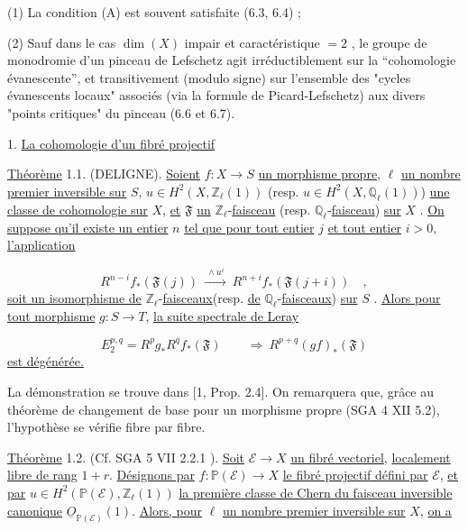 (1) La condition (A) est souvent satisfaite (6.3, 6.4) ;

(2) Sauf dans le cas $\dim(X)$ impair et caractéristique $= 2$ , le groupe de monodromie d'un pinceau de Lefschetz agit irréductiblement sur la ``cohomologie évanescente'', et transitivement (modulo signe) sur l'ensemble des
"cycles évanescents locaux" associés (via la formule de Picard-Lefschetz) aux divers "points critiques" du pinceau (6.6 et 6.7).


1. \underline{La cohomologie d'un fibré projectif}

\underline{Théorème} 1.1. (DELIGNE). \underline{Soient} $f : X \longrightarrow S$ \underline{un morphisme propre}, $\ell$ \underline{un nombre premier inversible sur} $S$, $u \in H^2(X,\mathbb{Z}_\ell(1))$ (resp. $u \in H^2(X,\mathbb{Q}_\ell(1))$) \underline{une classe de cohomologie sur} $X$, \underline{et} $\mathfrak{F}$ \underline{un} $\mathbb{Z}_\ell$-\underline{faisceau} (resp. $\mathbb{Q}_\ell$-\underline{faisceau}) \underline{sur} $X$ . \underline{On suppose qu'il existe un entier} $n$ \underline{tel que pour tout entier} $j$ \underline{et tout entier} $i > 0$, \underline{l'application}

\begin{equation}\tag{1.1.1}
R^{n-i} f_*(\mathfrak{F}(j)) \ \xrightarrow{\ \wedge u^i\ }\ R^{n+i} f_*(\mathfrak{F}(j+i)) \quad ,
\end{equation}
\underline{soit un isomorphisme de} $\mathbb{Z}_\ell$-\underline{faisceaux}(resp. \underline{de} $\mathbb{Q}_\ell$-\underline{faisceaux}) \underline{sur} $S$ . \underline{Alors pour tout morphisme} $g : S \longrightarrow T$, \underline{la suite spectrale de Leray}

\begin{equation*}
E_2^{p,q} = R^p g_* R^q f_*(\mathfrak{F}) \qquad \Longrightarrow\ R^{p+q}(gf)_*(\mathfrak{F})
\end{equation*}
\underline{est dégénérée.}

La démonstration se trouve dans [1, Prop. 2.4]. On remarquera que, grâce au théorème de changement de base pour un morphisme propre (SGA 4 XII  5.2), l'hypothèse se vérifie fibre par fibre.



\underline{Théorème} 1.2. (Cf. SGA 5 VII 2.2.1 ). \underline{Soit} $\mathcal{E} \longrightarrow X$ \underline{un fibré vectoriel}, \underline{localement libre de rang} $1 + r$. \underline{Désignons par} $f : \mathbb{P}(\mathcal{E}) \longrightarrow X$ \underline{le fibré projectif défini par} $\mathcal{E}$, \underline{et par} $u \in H^2(\mathbb{P}(\mathcal{E}),\mathbb{Z}_\ell(1))$ \underline{la première classe de Chern du faisceau inversible canonique} $\underline{O}_{\mathbb{P}(\mathcal{E})}(1)$. \underline{Alors, pour} $\ell$ \underline{un nombre premier inversible sur} $X$, \underline{on a}

